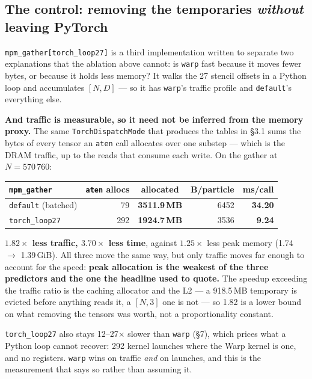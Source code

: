 \documentclass[11pt,a4paper]{article}
\newcommand{\code}[1]{\texttt{\small #1}}
\newcommand{\gd}[1]{\textcolor{good}{\textbf{#1}}}
\newcommand{\bd}[1]{\textcolor{bad}{\textbf{#1}}}
\begin{document}
\subsection{The control: removing the temporaries \emph{without} leaving PyTorch}

\code{mpm\_gather[torch\_loop27]} is a third implementation written to separate two explanations that
the ablation above cannot: is \code{warp} fast because it moves fewer bytes, or because it holds less
memory? It walks the 27 stencil offsets in a Python loop and accumulates $[N,D]$ --- so it has
\code{warp}'s traffic profile and \code{default}'s everything else.

\textbf{And traffic is measurable, so it need not be inferred from the memory proxy.} The same
\code{TorchDispatchMode} that produces the tables in \S3.1 sums the bytes of every tensor an
\code{aten} call allocates over one substep --- which is the DRAM traffic, up to the reads that
consume each write. On the gather at $N=570\,760$:

\begin{center}\footnotesize
\begin{tabular}{@{}lrrrr@{}}
\toprule
\code{mpm\_gather} & \multicolumn{1}{c}{\code{aten} allocs} & \multicolumn{1}{c}{allocated} &
\multicolumn{1}{c}{B/particle} & \multicolumn{1}{c}{ms/call} \\
\midrule
\code{default} (batched)   &  79 & \bd{3511.9\,MB} & 6452 & \bd{34.20} \\
\code{torch\_loop27}       & 292 & \gd{1924.7\,MB} & 3536 & \gd{9.24} \\
\bottomrule
\end{tabular}
\end{center}

\noindent
\gd{$1.82\times$ less traffic, $3.70\times$ less time}, against \gd{$1.25\times$} less peak memory
(1.74 $\to$ 1.39\,GiB). All three move the same way, but only traffic moves far enough to account for
the speed: \textbf{peak allocation is the weakest of the three predictors and the one the headline
used to quote.} The speedup exceeding the traffic ratio is the caching allocator and the L2 --- a
918.5\,MB temporary is evicted before anything reads it, a $[N,3]$ one is not --- so 1.82 is a lower
bound on what removing the tensors was worth, not a proportionality constant.

\code{torch\_loop27} also stays 12--27$\times$ slower than \code{warp} (\S7), which prices what a
Python loop cannot recover: 292 kernel launches where the Warp kernel is one, and no registers.
\code{warp} wins on traffic \emph{and} on launches, and this is the measurement that says so rather
than assuming it.
\end{document}
